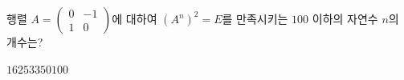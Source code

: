 행렬 $A=\begin{pmatrix} 0 & -1 \\ 1 & 0 \end{pmatrix}$에 대하여 $(A^n)^2=E$를 만족시키는 $100$ 이하의 자연수 $n$의 개수는? 
\begin{choices32}{$16$}{$25$}{$33$}{$50$}{$100$}\end{choices32}
